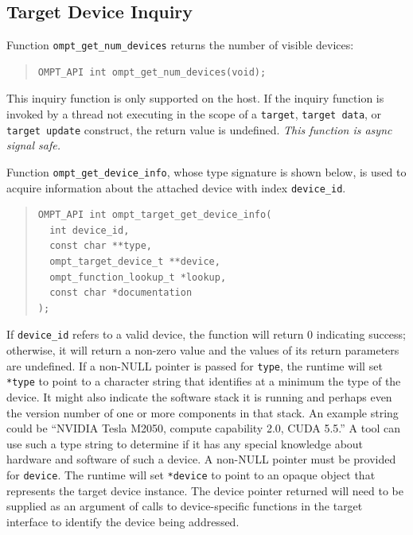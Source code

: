 \documentclass{article}
\begin{document}
\subsection{Target Device Inquiry}
\label{sec:target-region}
Function \verb|ompt_get_num_devices| returns the number of visible devices:
\begin{quote}
\begin{verbatim}
OMPT_API int ompt_get_num_devices(void);
\end{verbatim}
\end{quote}
This inquiry function is only supported on the host. If the inquiry function is invoked by a thread not executing in the scope of a {\tt target}, {\tt target data}, or {\tt target update} construct, the return value is undefined. {\it This function is async signal safe.}

Function \verb|ompt_get_device_info|, whose type signature is shown below, is used to acquire information about the attached device with  index \verb|device_id|. 
\begin{quote}
\begin{verbatim}
OMPT_API int ompt_target_get_device_info(
  int device_id, 
  const char **type, 
  ompt_target_device_t **device,
  ompt_function_lookup_t *lookup,
  const char *documentation
);
\end{verbatim}
\end{quote}
If \verb|device_id| refers to a valid device, the function will return 0 indicating success; otherwise, it will return a non-zero value and the values of its return parameters are undefined. If a non-NULL pointer is passed for \verb|type|, the runtime will set \verb|*type| to point to a character string that identifies at a minimum the  type of the device. It might also indicate the software stack it is running and perhaps even the version number of one or more components in that stack. An example string could be ``NVIDIA Tesla M2050, compute capability 2.0, CUDA 5.5.'' A tool can use such a type string to determine if it has any special knowledge about hardware and software of such a device. A non-NULL pointer must be provided for \verb|device|. The runtime will set \verb|*device| to point to an opaque object that represents the target device instance. The device pointer returned will need to be supplied as an argument of calls to device-specific functions in the target interface to identify the device being addressed.
\end{document}
